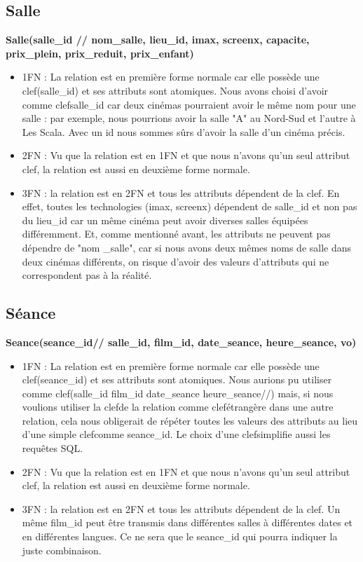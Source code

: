 \documentclass[12pt]{article}
\begin{document}
\subsection{Salle}
\textbf{Salle(salle{\_}id // nom{\_}salle, lieu{\_}id, imax, screenx, capacite, prix{\_}plein, prix{\_}reduit, prix{\_}enfant)} \\
\begin{itemize}
    \item 1FN : La relation est en première forme normale car elle 
    possède une clef(salle{\_}id) et ses attributs sont atomiques. 
    Nous avons choisi d’avoir comme clefsalle{\_}id car deux cinémas 
    pourraient avoir le même nom pour une salle : par exemple, nous pourrions avoir la 
    salle "A" au Nord-Sud et l’autre à Les Scala. Avec un id nous sommes sûrs d’avoir la salle d’un cinéma précis. 
    \item 2FN : Vu que la relation est en 1FN et que nous n'avons qu'un seul attribut clef, la relation est aussi
    en deuxième forme normale.
    \item 3FN : la relation est en 2FN et tous les attributs dépendent de la clef. 
    En effet, toutes les technologies (imax, screenx) dépendent de salle{\_}id et 
    non pas du lieu{\_}id car un même cinéma peut avoir diverses salles équipées différemment. 
    Et, comme mentionné avant, les attributs ne peuvent pas dépendre de "nom {\_}salle", 
    car si nous avons deux mêmes noms de salle dans deux cinémas différents, 
    on risque d’avoir des valeurs d’attributs qui ne correspondent pas à la réalité.
\end{itemize}
\subsection{Séance}
\textbf{Seance(seance{\_}id//  salle{\_}id, film{\_}id, date{\_}seance, heure{\_}seance, vo)}
\begin{itemize}
    \item 1FN : La relation est en première forme normale car elle 
    possède une clef(seance{\_}id) et ses attributs sont atomiques. 
    Nous aurions pu utiliser comme clef(salle{\_}id film{\_}id date{\_}seance heure{\_}seance//) 
    mais, si nous voulions utiliser la clefde la relation comme clefétrangère dans une autre relation, 
    cela nous obligerait de répéter toutes les valeurs des attributs au lieu 
    d’une simple clefcomme seance{\_}id. Le choix d’une clefsimplifie aussi les requêtes SQL. 
    \item 2FN : Vu que la relation est en 1FN et que nous n'avons qu'un seul attribut clef, la relation est aussi
    en deuxième forme normale.
    \item 3FN : la relation est en 2FN et tous les attributs dépendent de la clef. Un même film{\_}id peut 
    être transmis dans différentes salles à différentes dates et en 
    différentes langues. Ce ne sera que le seance{\_}id qui pourra indiquer la juste combinaison. 
\end{itemize}
\pagebreak
\end{document}
